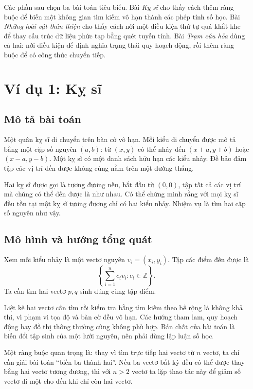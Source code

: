 \documentclass[11pt]{article}
\begin{document}
Các phần sau chọn ba bài toán tiêu biểu. Bài \textit{Kỵ sĩ} cho thấy cách thêm
ràng buộc để biến một không gian tìm kiếm vô hạn thành các phép tính số học.
Bài \textit{Những loài vật thân thiện} cho thấy cách nới một điều kiện thứ tự
quá khắt khe để thay cấu trúc dữ liệu phức tạp bằng quét tuyến tính. Bài
\textit{Trạm cứu hỏa} dùng cả hai: nới điều kiện để định nghĩa trạng thái quy
hoạch động, rồi thêm ràng buộc để có công thức chuyển tiếp.

\section{Ví dụ 1: Kỵ sĩ}

\subsection{Mô tả bài toán}

Một quân kỵ sĩ di chuyển trên bàn cờ vô hạn. Mỗi kiểu di chuyển được mô tả
bằng một cặp số nguyên \((a,b)\): từ \((x,y)\) có thể nhảy đến
\((x+a,y+b)\) hoặc \((x-a,y-b)\). Một kỵ sĩ có một danh sách hữu hạn các kiểu
nhảy. Đề bảo đảm tập các vị trí đến được không cùng nằm trên một đường thẳng.

Hai kỵ sĩ được gọi là tương đương nếu, bắt đầu từ \((0,0)\), tập tất cả các
vị trí mà chúng có thể đến được là như nhau. Có thể chứng minh rằng với mọi
kỵ sĩ đều tồn tại một kỵ sĩ tương đương chỉ có hai kiểu nhảy. Nhiệm vụ là tìm
hai cặp số nguyên như vậy.

\subsection{Mô hình và hướng tổng quát}

Xem mỗi kiểu nhảy là một vectơ nguyên \(v_i=(x_i,y_i)\). Tập các điểm đến được
là
\[
  \left\{\sum_{i=1}^{n} c_i v_i : c_i\in\mathbb{Z}\right\}.
\]
Ta cần tìm hai vectơ \(p,q\) sinh đúng cùng tập điểm.

Liệt kê hai vectơ cần tìm rồi kiểm tra bằng tìm kiếm theo bề rộng là không khả
thi, vì phạm vi tọa độ và bàn cờ đều vô hạn. Các hướng tham lam, quy hoạch
động hay đồ thị thông thường cũng không phù hợp. Bản chất của bài toán là biến
đổi tập sinh của một lưới nguyên, nên phải dùng lập luận số học.

Một ràng buộc quan trọng là: thay vì tìm trực tiếp hai vectơ từ \(n\) vectơ,
ta chỉ cần giải bài toán ``biến ba thành hai''. Nếu ba vectơ bất kỳ đều có thể
được thay bằng hai vectơ tương đương, thì với \(n>2\) vectơ ta lặp thao tác
này để giảm số vectơ đi một cho đến khi chỉ còn hai vectơ.
\end{document}
